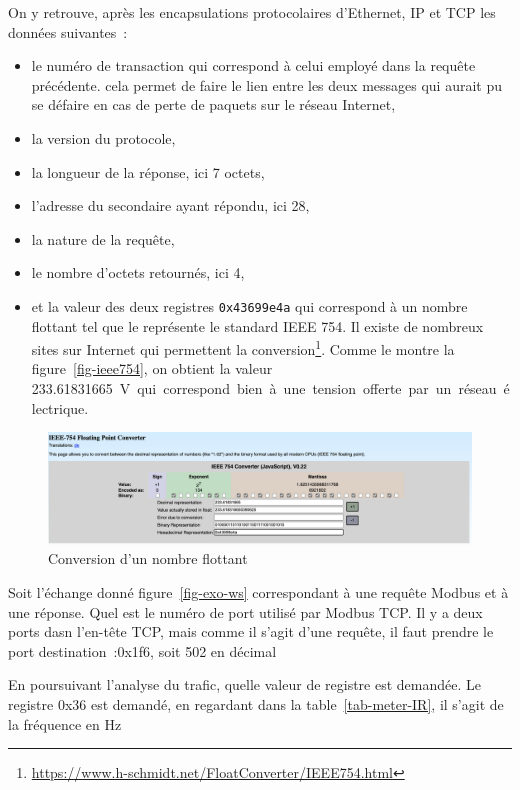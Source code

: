 On y retrouve, après les encapsulations protocolaires d'Ethernet, IP et TCP les données suivantes~:
\begin{itemize}
    \item le numéro de transaction qui correspond à celui employé dans la requête précédente. cela permet de faire le lien entre les deux messages qui aurait pu se défaire en cas de perte de paquets sur le réseau Internet,
    \item la version du protocole,
    \item la longueur de la réponse, ici 7 octets,
    \item l'adresse du secondaire ayant répondu, ici 28,
    \item la nature de la requête,
    \item le nombre d'octets retournés, ici 4,
    \item et la valeur des deux registres \texttt{0x43699e4a} qui correspond à un nombre flottant tel que le représente le standard IEEE 754. Il existe de nombreux sites sur Internet qui permettent la conversion\footnote{\url{https://www.h-schmidt.net/FloatConverter/IEEE754.html}}. Comme le montre la figure~\vref{fig-ieee754}, on obtient la valeur \SI{233.61831665}\volt qui correspond bien à une tension offerte par un réseau électrique.
\end{itemize}

  \begin{figure}[tbp]
\centerline{\includegraphics[width=1\columnwidth]{Pictures/IEEE754.png}}
\caption{Conversion d'un nombre flottant}
\label{fig-ieee754}
\end{figure}

{Soit l'échange donné figure~\vref{fig-exo-ws} correspondant à une requête Modbus et à une réponse.
Quel est le numéro de port utilisé par Modbus TCP.}
{Il y a deux ports dasn l'en-tête TCP, mais comme il s'agit d'une requête, il faut prendre le port destination~:0x1f6, soit 502 en décimal}

{En poursuivant l'analyse du trafic, quelle valeur de registre est demandée.}
{Le registre 0x36 est demandé, en regardant dans la table~\vref{tab-meter-IR}, il s'agit de la fréquence en Hz}

